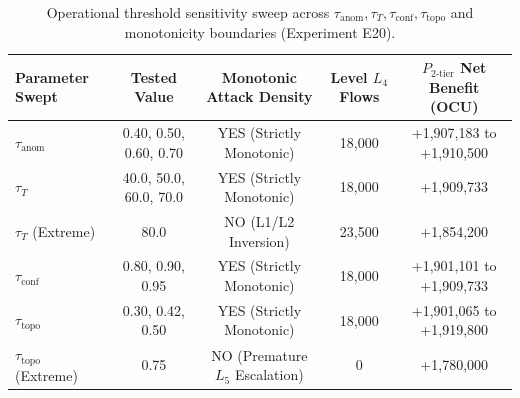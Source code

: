 \begin{table}[t]
\caption{Operational threshold sensitivity sweep across $\tau_{\text{anom}}, \tau_T, \tau_{\text{conf}}, \tau_{\text{topo}}$ and monotonicity boundaries (Experiment E20).}
\label{tab:posture_threshold_sensitivity}
\centering
\small
\begin{tabular}{lcccc}
\toprule
\textbf{Parameter Swept} & \textbf{Tested Value} & \textbf{Monotonic Attack Density} & \textbf{Level $L_4$ Flows} & \textbf{$P_{2\text{-tier}}$ Net Benefit (OCU)} \\
\midrule
$\tau_{\text{anom}}$ & 0.40, 0.50, 0.60, 0.70 & YES (Strictly Monotonic) & 18,000 & +1,907,183 to +1,910,500 \\
$\tau_T$ & 40.0, 50.0, 60.0, 70.0 & YES (Strictly Monotonic) & 18,000 & +1,909,733 \\
$\tau_T$ (Extreme) & 80.0 & NO (L1/L2 Inversion) & 23,500 & +1,854,200 \\
$\tau_{\text{conf}}$ & 0.80, 0.90, 0.95 & YES (Strictly Monotonic) & 18,000 & +1,901,101 to +1,909,733 \\
$\tau_{\text{topo}}$ & 0.30, 0.42, 0.50 & YES (Strictly Monotonic) & 18,000 & +1,901,065 to +1,919,800 \\
$\tau_{\text{topo}}$ (Extreme) & 0.75 & NO (Premature $L_5$ Escalation) & 0 & +1,780,000 \\
\bottomrule
\end{tabular}
\end{table}
